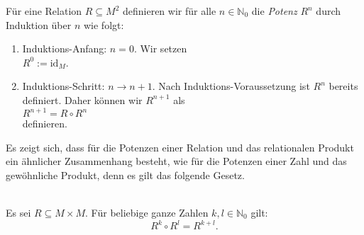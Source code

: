 \begin{Definition}
  F\"{u}r eine Relation $R \subseteq M^2$ definieren wir f\"{u}r alle $n \in \mathbb{N}_0$ die \emph{Potenz} $R^n$
  durch Induktion \"{u}ber $n$ wie folgt:  
  \begin{enumerate}
  \item Induktions-Anfang: $n= 0$.  Wir setzen \\[0.2cm]
        \hspace*{1.3cm} $R^0 := \mathrm{id}_M$.
  \item Induktions-Schritt: $n \rightarrow n + 1$. Nach Induktions-Voraussetzung ist $R^n$
        bereits definiert. Daher k\"{o}nnen wir $R^{n+1}$ als \\[0.2cm]
        \hspace*{1.3cm} $R^{n+1} = R \circ R^n$
        \\[0.2cm]
        definieren. \eox
\end{enumerate}
\end{Definition}

Es zeigt sich, dass f\"{u}r die Potenzen einer Relation und das relationalen Produkt ein \"{a}hnlicher
Zusammenhang besteht, wie f\"{u}r die Potenzen einer Zahl und das gew\"{o}hnliche Produkt, denn es gilt das
folgende Gesetz.

\begin{Satz} \hspace*{\fill} \\
  Es sei $R \subseteq M \times M$.  F\"{u}r beliebige ganze Zahlen $k,l \in \mathbb{N}_0$ gilt:
  \[ R^k \circ R^l = R^{k+l}. \]
\end{Satz}

